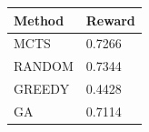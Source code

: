 \begin{tabular}{ll}
\hline
Method & Reward \\
\hline
  MCTS & 0.7266 \\
  RANDOM & 0.7344 \\
  GREEDY & 0.4428 \\
  GA & 0.7114 \\
\hline
\end{tabular}
